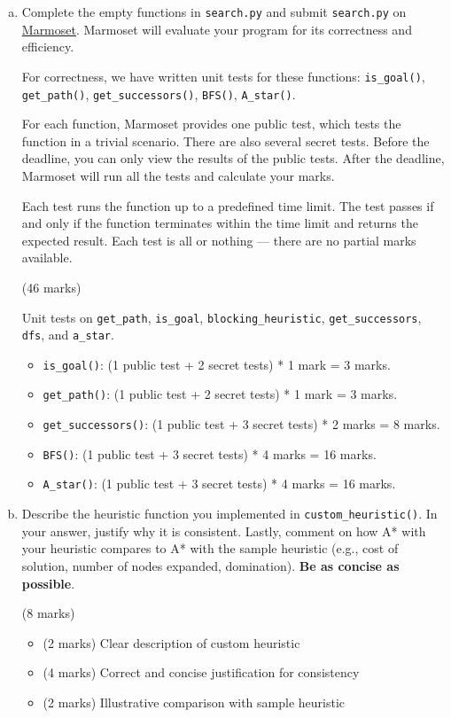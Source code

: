\documentclass[12pt]{article}
\begin{document}
\begin{enumerate}[(a)]

\item Complete the empty functions in \verb+search.py+ and submit \verb+search.py+ on \href{https://marmoset.student.cs.uwaterloo.ca/}{Marmoset}. Marmoset will evaluate your program for its correctness and efficiency.

For correctness, we have written unit tests for these functions: \verb+is_goal()+, \verb+get_path()+, \verb+get_successors()+, \verb+BFS()+, \verb+A_star()+.

For each function, Marmoset provides one public test, which tests the function in a trivial scenario. There are also several secret tests. Before the deadline, you can only view the results of the public tests. After the deadline, Marmoset will run all the tests and calculate your marks.

Each test runs the function up to a predefined time limit. The test passes if and only if the function terminates within the time limit and returns the expected result. Each test is all or nothing --- there are no partial marks available.

\begin{markscheme}
(46 marks) 

Unit tests on \verb+get_path+, \verb+is_goal+, \verb+blocking_heuristic+, \verb+get_successors+, \verb+dfs+, and \verb+a_star+. 

\begin{itemize}
\item \verb+is_goal()+:  (1 public test + 2 secret tests) * 1 mark = 3 marks.
\item \verb+get_path()+: (1 public test + 2 secret tests) * 1 mark = 3 marks.
\item \verb+get_successors()+: (1 public test + 3 secret tests) * 2 marks = 8 marks.
\item \verb+BFS()+:    (1 public test + 3 secret tests) * 4 marks = 16 marks.
\item \verb+A_star()+: (1 public test + 3 secret tests) * 4 marks = 16 marks.
\end{itemize}

\end{markscheme}
  
\item Describe the heuristic function you implemented in \verb+custom_heuristic()+. In your answer, justify why it is consistent. Lastly, comment on how A* with your heuristic compares to A* with the sample heuristic (e.g., cost of solution, number of nodes expanded, domination). \textbf{Be as concise as possible}.

\begin{markscheme} (8 marks)
\begin{itemize}
\item (2 marks) Clear description of custom heuristic
\item (4 marks) Correct and concise justification for consistency
\item (2 marks) Illustrative comparison with sample heuristic
\end{itemize}
\end{markscheme}

 

\end{enumerate}
\end{document}
